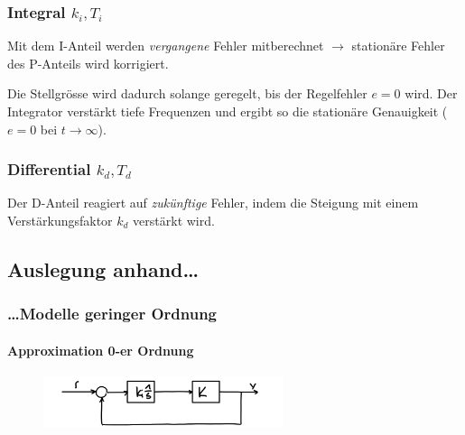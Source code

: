\documentclass[
  10pt,
  a4paper,
  twocolumn]{article}
\let\oldparagraph\paragraph
\renewcommand{\paragraph}[1]{\oldparagraph{#1}\mbox{}}
\numberwithin{equation}{section}
\let\paragraph\oldparagraph
\renewcommand{\paragraph}[1]{\oldparagraph{#1}\mbox{}\par}
\begin{document}
\hypertarget{k_it_i}{%
\subsubsection{\texorpdfstring{\textcolor{NavyBlue}{Integral}
\(k_i,T_i\)}{ k\_i,T\_i}}\label{k_it_i}}

Mit dem I-Anteil werden \emph{vergangene} Fehler mitberechnet
\(\rightarrow\) stationäre Fehler des P-Anteils wird korrigiert.

Die Stellgrösse wird dadurch solange geregelt, bis der Regelfehler
\(e=0\) wird. Der Integrator verstärkt tiefe Frequenzen und ergibt so
die stationäre Genauigkeit ( \(e=0\) bei \(t\rightarrow\infty\)).

\hypertarget{k_dt_d}{%
\subsubsection{\texorpdfstring{\textcolor{OliveGreen}{Differential}
\(k_d,T_d\)}{ k\_d,T\_d}}\label{k_dt_d}}

Der D-Anteil reagiert auf \emph{zukünftige} Fehler, indem die Steigung
mit einem Verstärkungsfaktor \(k_d\) verstärkt wird.

\hypertarget{auslegung-anhand}{%
\subsection{Auslegung anhand\ldots{}}\label{auslegung-anhand}}

\hypertarget{modelle-geringer-ordnung}{%
\subsubsection{\ldots Modelle geringer
Ordnung}\label{modelle-geringer-ordnung}}

\hypertarget{approximation-0-er-ordnung}{%
\paragraph{Approximation 0-er
Ordnung}\label{approximation-0-er-ordnung}}

\begin{figure}[H]

{\centering \includegraphics[width=7cm,height=\textheight]{images/paste-31.png}

}

\end{figure}
\end{document}
